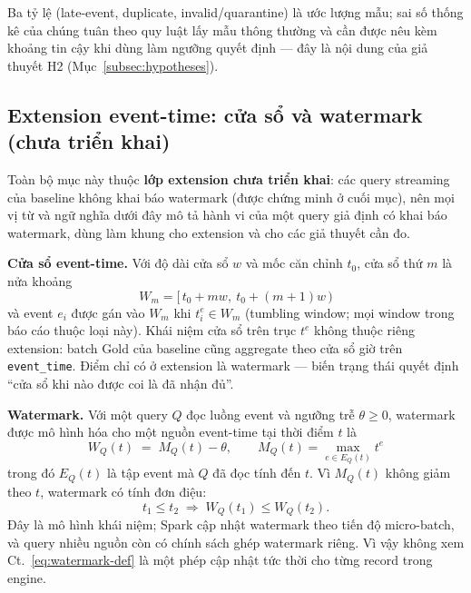 Ba tỷ lệ (late-event, duplicate, invalid/quarantine) là ước lượng mẫu; sai số
thống kê của chúng tuân theo quy luật
lấy mẫu thông thường và cần được nêu kèm khoảng tin cậy khi dùng làm ngưỡng
quyết định --- đây là nội dung của giả thuyết H2
(Mục~\ref{subsec:hypotheses}).

\subsection{Extension event-time: cửa sổ và watermark (chưa triển khai)}
\label{subsec:watermark}

Toàn bộ mục này thuộc \textbf{lớp extension chưa triển khai}: các query
streaming của baseline không khai báo watermark (được chứng minh ở cuối
mục), nên mọi vị từ và ngữ nghĩa dưới đây mô tả hành vi của một query
giả định có khai báo watermark, dùng làm khung cho extension và cho các giả
thuyết cần đo.

\textbf{Cửa sổ event-time.} Với độ dài cửa sổ $w$ và mốc căn chỉnh $t_0$,
cửa sổ thứ $m$ là nửa khoảng
\begin{equation}
  W_m = [\,t_0 + m w,\ t_0 + (m+1) w\,)
  \label{eq:window-def}
\end{equation}
và event $e_i$ được gán vào $W_m$ khi $t^{e}_i \in W_m$ (tumbling window;
mọi window trong báo cáo thuộc loại này). Khái niệm cửa sổ trên trục
$t^{e}$ không thuộc riêng extension: batch Gold của baseline cũng aggregate
theo cửa sổ giờ trên \texttt{event\_time}. Điểm chỉ có ở extension là
watermark --- biến trạng thái quyết định ``cửa sổ khi nào được coi là đã
nhận đủ''.

\textbf{Watermark.} Với một query $Q$ đọc luồng event và ngưỡng trễ
$\theta \geq 0$, watermark được mô hình hóa cho một nguồn event-time
tại thời điểm $t$ là
\begin{equation}
  W_Q(t) \;=\; M_Q(t) - \theta,
  \qquad
  M_Q(t) = \max_{e \in E_Q(t)} t^{e}
  \label{eq:watermark-def}
\end{equation}
trong đó $E_Q(t)$ là tập event mà $Q$ đã đọc tính đến $t$. Vì $M_Q(t)$ không
giảm theo $t$, watermark có tính đơn điệu:
\begin{equation}
  t_1 \leq t_2 \;\Longrightarrow\; W_Q(t_1) \leq W_Q(t_2).
  \label{eq:watermark-mono}
\end{equation}
Đây là mô hình khái niệm; Spark cập nhật watermark theo tiến độ
micro-batch, và query nhiều nguồn còn có chính sách ghép watermark riêng.
Vì vậy không xem Ct.~\ref{eq:watermark-def} là một phép cập nhật tức thời
cho từng record trong engine.

